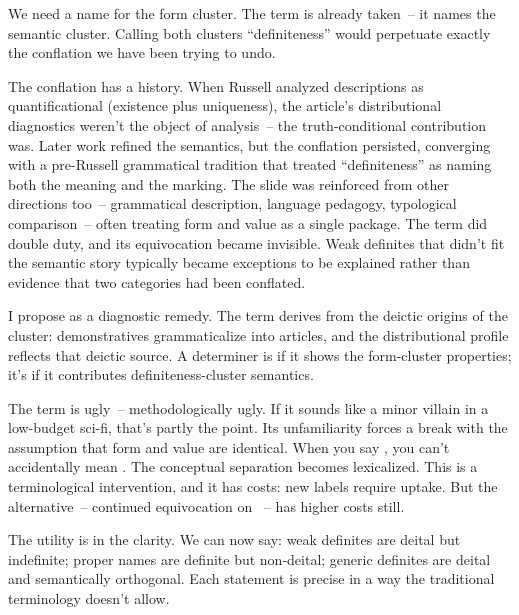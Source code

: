 We need a name for the form cluster. The term  is already taken~-- it names the semantic cluster. Calling both clusters \enquote{definiteness} would perpetuate exactly the conflation we have been trying to undo.

The conflation has a history. When Russell analyzed  descriptions as quantificational (existence plus uniqueness), the article's distributional diagnostics weren't the object of analysis~-- the truth-conditional contribution was. Later work refined the semantics, but the conflation persisted, converging with a pre-Russell grammatical tradition that treated \enquote{definiteness} as naming both the meaning and the marking. The slide was reinforced from other directions too~-- grammatical description, language pedagogy, typological comparison~-- often treating form and value as a single package. The term did double duty, and its equivocation became invisible. Weak definites that didn't fit the semantic story typically became exceptions to be explained rather than evidence that two categories had been conflated.

I propose  as a diagnostic remedy. The term derives from the deictic origins of the cluster: demonstratives grammaticalize into articles, and the distributional profile reflects that deictic source. A determiner is  if it shows the form-cluster properties; it's  if it contributes definiteness-cluster semantics.

The term is ugly~-- methodologically ugly. If it sounds like a minor villain in a low-budget sci-fi, that's partly the point. Its unfamiliarity forces a break with the assumption that form and value are identical. When you say , you can't accidentally mean . The conceptual separation becomes lexicalized. This is a terminological intervention, and it has costs: new labels require uptake. But the alternative~-- continued equivocation on ~-- has higher costs still.

The utility is in the clarity. We can now say: weak definites are deital but indefinite; proper names are definite but non-deital; generic definites are deital and semantically orthogonal. Each statement is precise in a way the traditional terminology doesn't allow.

